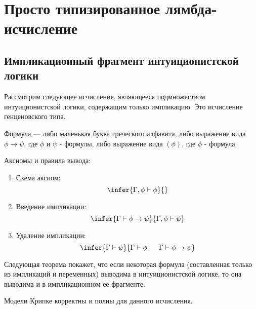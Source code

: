 \section{Просто типизированное лямбда-исчисление}

\subsection{Импликационный фрагмент интуиционистской логики}

Рассмотрим следующее исчисление, являющееся подмножеством интуиционистской
логики, содержащим только импликацию. Это исчисление генценовского типа.

Формула --- либо маленькая буква греческого алфавита, либо выражение вида
$\phi \rightarrow \psi$, где $\phi$ и $\psi$ - формулы, либо выражение вида $(\phi)$, где $\phi$ - формула.

Аксиомы и правила вывода:

\begin{enumerate}
\item Схема аксиом:
$$\infer{\Gamma, \phi \vdash \phi}{}$$
\item Введение импликации:
$$\infer{\Gamma \vdash \phi \rightarrow \psi}{\Gamma, \phi \vdash \psi}$$
\item Удаление импликации:
$$\infer{\Gamma \vdash \psi}{\Gamma\vdash\phi~~~~~\Gamma\vdash\phi\rightarrow\psi}$$
\end{enumerate}

Следующая теорема покажет, что если некоторая формула (составленная только из
импликаций и переменных) выводима в интуиционистской логике, то она выводима
и в импликационном ее фрагменте.

\begin{theorem}
Модели Крипке корректны и полны для данного исчисления.
\end{theorem}


